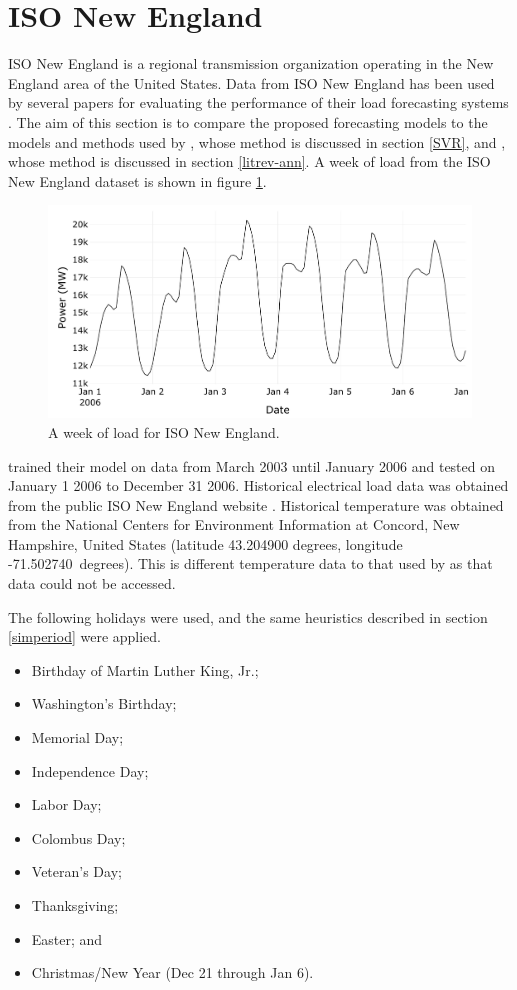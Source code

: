 \section{ISO New England}
ISO New England is a regional transmission organization operating in the New England area of the United States.
Data from ISO New England has been used by several papers for evaluating the performance of their load forecasting systems \cite{Ceperic2013}\cite{Chen2010}.
The aim of this section is to compare the proposed forecasting models to the models and methods used by \citet{Ceperic2013}, whose method is discussed in section \ref{SVR}, and \citet{Chen2010}, whose method is discussed in section \ref{litrev-ann}.
A week of load from the ISO New England dataset is shown in figure \ref{fig:week-isone}.

\begin{figure}[htbp]
	\centerline{\includegraphics[width=.9\textwidth]{images/week-isone.pdf}}
	\caption{A week of load for ISO New England.}
	\label{fig:week-isone}
\end{figure}

\citet{Ceperic2013} trained their model on data from March 2003 until January 2006 and tested on January 1 2006 to December 31 2006.
Historical electrical load data was obtained from the public ISO New England website \cite{isone}.
Historical temperature was obtained from the National Centers for Environment Information \cite{NOAA} at Concord, New Hampshire, United States (latitude 43.204900 degrees, longitude \mbox{-71.502740 degrees}).
This is different temperature data to that used by \citet{Ceperic2013} as that data could not be accessed.

The following holidays were used, and the same heuristics described in section \ref{simperiod} were applied.
\begin{itemize}
	\item Birthday of Martin Luther King, Jr.;
	\item Washington's Birthday;
	\item Memorial Day;
	\item Independence Day;
	\item Labor Day;
	\item Colombus Day;
	\item Veteran's Day;
	\item Thanksgiving;
	\item Easter; and
	\item Christmas/New Year (Dec 21 through Jan 6).
\end{itemize}

